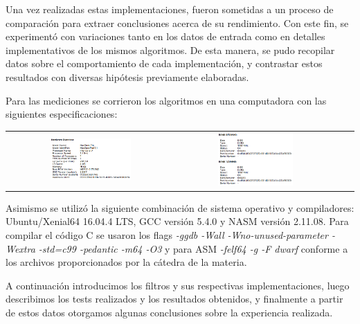 Una vez realizadas estas implementaciones, fueron sometidas a un proceso de comparación para extraer conclusiones acerca de su rendimiento. Con este fin, se experimentó con variaciones tanto en los datos de entrada como en detalles implementativos de los mismos algoritmos. De esta manera, se pudo recopilar datos sobre el comportamiento de cada implementación, y contrastar estos resultados con diversas hipótesis previamente elaboradas.

Para las mediciones se corrieron los algoritmos en una computadora con las siguientes especificaciones:

\begin{center}
  \begin{tabular}{cccc}
    \includegraphics[width=0.5\textwidth]{imagenes/hardware.png} &
    \includegraphics[width=0.5\textwidth]{imagenes/memory.png} \\
  \end{tabular}
 \end{center}

 Asimismo se utilizó la siguiente combinación de sistema operativo y compiladores: Ubuntu/Xenial64 16.04.4 LTS, GCC versión 5.4.0 y NASM versión 2.11.08. Para compilar el código C se usaron los flags \textit{-ggdb -Wall -Wno-unused-parameter -Wextra -std=c99 -pedantic -m64 -O3} y para ASM \textit{-felf64 -g -F dwarf} conforme a los archivos proporcionados por la cátedra de la materia.


A continuación introducimos los filtros y sus respectivas implementaciones, luego describimos los tests realizados y los resultados obtenidos, y finalmente a partir de estos datos otorgamos algunas conclusiones sobre la experiencia realizada.

